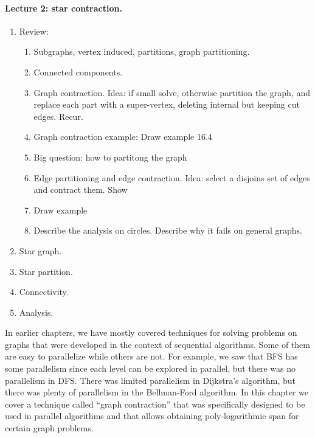 {\begin{notesonly}
\begin{enumerate}
\begin{enumerate}
\end{enumerate}

\end{enumerate}


\paragraph{Lecture 2: star contraction.} 

\begin{enumerate}
\item Review:

\begin{enumerate}
\item Subgraphs, vertex induced, partitions, graph partitioning.
\item Connected components.
\item Graph contraction.  Idea: if small solve, otherwise partition
  the graph, and replace each part with a super-vertex, deleting
  internal but keeping cut edges.  Recur.

\item Graph contraction example: Draw example 16.4
\item Big question: how to partitong the graph
\item Edge partitioning and edge contraction. Idea: select a disjoins
  set of edges and contract them. Show
\item Draw example 
\item Describe the analysis on circles.  Describe why it fails on
  general graphs.
\end{enumerate}

\item Star graph.
\item Star partition.
\item Connectivity.
\item Analysis.

\end{enumerate}


\end{notesonly}



In earlier chapters, we have mostly covered techniques for solving
problems on graphs that were developed in the context of sequential
algorithms.  Some of them are easy to parallelize while others are
not.  For example, we saw that BFS has some parallelism since each
level can be explored in parallel, but there was no parallelism in
DFS.
There was limited parallelism in Dijkstra's algorithm, but there was
plenty of parallelism in the Bellman-Ford algorithm.
%
In this chapter we cover a technique called ``graph contraction''
that was specifically designed to be used in parallel algorithms and
that allows obtaining poly-logarithmic span for certain graph problems.

}
